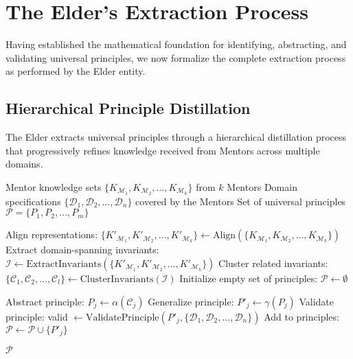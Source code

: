 \section{The Elder's Extraction Process}

Having established the mathematical foundation for identifying, abstracting, and validating universal principles, we now formalize the complete extraction process as performed by the Elder entity.

\subsection{Hierarchical Principle Distillation}

The Elder extracts universal principles through a hierarchical distillation process that progressively refines knowledge received from Mentors across multiple domains.

\begin{algorithm}
\begin{algorithmic}[1]
\REQUIRE Mentor knowledge sets $\{K_{\mathcal{M}_1}, K_{\mathcal{M}_2}, \ldots, K_{\mathcal{M}_k}\}$ from $k$ Mentors
\REQUIRE Domain specifications $\{\mathcal{D}_1, \mathcal{D}_2, \ldots, \mathcal{D}_n\}$ covered by the Mentors
\ENSURE Set of universal principles $\mathcal{P} = \{P_1, P_2, \ldots, P_m\}$

\STATE Align representations: $\{K'_{\mathcal{M}_1}, K'_{\mathcal{M}_2}, \ldots, K'_{\mathcal{M}_k}\} \gets \text{Align}(\{K_{\mathcal{M}_1}, K_{\mathcal{M}_2}, \ldots, K_{\mathcal{M}_k}\})$
\STATE Extract domain-spanning invariants: $\mathcal{I} \gets \text{ExtractInvariants}(\{K'_{\mathcal{M}_1}, K'_{\mathcal{M}_2}, \ldots, K'_{\mathcal{M}_k}\})$
\STATE Cluster related invariants: $\{\mathcal{C}_1, \mathcal{C}_2, \ldots, \mathcal{C}_l\} \gets \text{ClusterInvariants}(\mathcal{I})$
\STATE Initialize empty set of principles: $\mathcal{P} \gets \emptyset$

    \STATE Abstract principle: $P_j \gets \alpha(\mathcal{C}_j)$
    \STATE Generalize principle: $P'_j \gets \gamma(P_j)$
    \STATE Validate principle: valid $\gets \text{ValidatePrinciple}(P'_j, \{\mathcal{D}_1, \mathcal{D}_2, \ldots, \mathcal{D}_n\})$
        \STATE Add to principles: $\mathcal{P} \gets \mathcal{P} \cup \{P'_j\}$
    \ENDIF
\ENDFOR

\RETURN $\mathcal{P}$
\end{algorithmic}
\end{algorithm}

